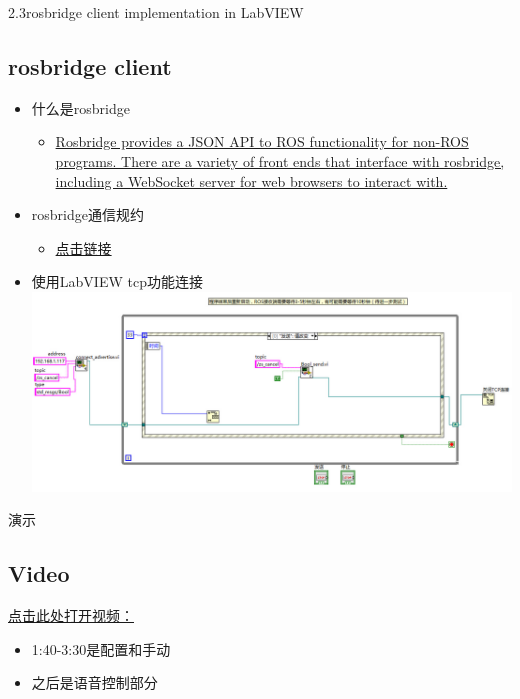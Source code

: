 \documentclass{beamer}
\begin{document}
\begin{frame}[t]{2.3rosbridge client implementation in LabVIEW}
    \subsection{rosbridge client}
    \begin{itemize}
        \item 什么是rosbridge
            \begin{itemize}
                \item \href{http://wiki.ros.org/rosbridge_suite}{Rosbridge provides a JSON API to ROS functionality for non-ROS programs.
                There are a variety of front ends that interface with rosbridge, including a WebSocket server for web browsers to interact with.}
            \end{itemize}
        \item rosbridge通信规约
            \begin{itemize}
                \item \href{https://github.com/RobotWebTools/rosbridge_suite/blob/develop/ROSBRIDGE_PROTOCOL.md}{点击链接}
            \end{itemize}
        \item 使用LabVIEW tcp功能连接
        \includegraphics[scale=0.3]{./resource/graph/rosbridge.jpg}
    \end{itemize}
\end{frame}
\begin{frame}[t]{演示}
    \subsection{Video}
    \href{./resource/video/1.avi}{点击此处打开视频：}
    \begin{itemize}
        \item 1:40-3:30是配置和手动
        \item 之后是语音控制部分
    \end{itemize}
\end{frame}
\end{document}
